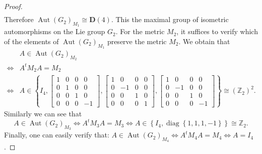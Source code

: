 \documentclass[12pt,a4paper,twoside]{article}
\theoremstyle{definition}
\begin{document}
\begin{proof}
\begin{eqnarray*}
\end{eqnarray*}
Therefore $\operatorname{Aut}\left(G_2\right)_{M_1} \cong \mathbf{D}(4)$. This the maximal group of isometric automorphisms on the Lie group $G_2$. For the metric $M_2$, it suffices to verify which of the elements of $\operatorname{Aut}\left(G_2\right)_{M_1}$ preserve the metric $M_2$. We obtain that
\begin{eqnarray*}
& A \in \operatorname{Aut}\left(G_2\right)_{M_2}\hspace{10cm}\\ \Leftrightarrow & A^tM_2A = M_2\hspace{10cm}\\
\Leftrightarrow & A \in \left\lbrace I_4, \begin{bmatrix}
1 & 0 & 0 & 0\\
0 & 1 & 0 & 0\\
0 & 0 & 1 & 0\\
0 & 0 & 0 & -1
\end{bmatrix}, \begin{bmatrix}
1 & 0 & 0 & 0\\
0 & -1 & 0 & 0\\
0 & 0 & 1 & 0\\
0 & 0 & 0 & 1
\end{bmatrix}, \begin{bmatrix}
1 & 0 & 0 & 0\\
0 & -1 & 0 & 0\\
0 & 0 & 1 & 0\\
0 & 0 & 0 & -1
\end{bmatrix} \right\rbrace \cong \left(\mathbb{Z}_2\right)^2.
\end{eqnarray*}
Similarly we can see that
$$
A \in \operatorname{Aut}\left(G_2\right)_{M_3} \Leftrightarrow A^tM_3A = M_3 \Leftrightarrow A \in \left\lbrace I_4, \operatorname{diag}\left\lbrace 1, 1, 1, -1\right\rbrace \right\rbrace \cong \mathbb{Z}_2.
$$
Finally, one can easily verify that: $A \in \operatorname{Aut}\left(G_2\right)_{M_4} \Leftrightarrow A^tM_4A = M_4 \Leftrightarrow A = I_4$.
\end{proof}
\end{document}
